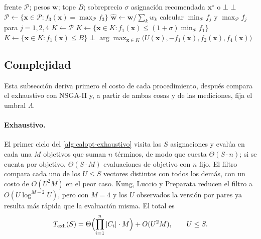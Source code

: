 \begin{algorithm}[htbp]
\caption{Selección a posteriori por utilidad aditiva (MAUT)}
\label{alg:calopt-maut}
\begin{algorithmic}[1]
\Require frente $\mathcal{P}$; pesos $\mathbf{w}$; tope $B$; sobreprecio $\sigma$
\Ensure asignación recomendada $\mathbf{x}^{\star}$ o $\bot$
   \Return $\bot$ \EndIf
  \State $\mathcal{P}\gets\{\mathbf{x}\in\mathcal{P}: f_3(\mathbf{x})=\max_{\mathcal{P}}f_3\}$ 
  \State $\hat{\mathbf{w}}\gets\mathbf{w}/\sum_k w_k$ 
  \State calcular $\min_{\mathcal{P}}f_j$ y $\max_{\mathcal{P}}f_j$ para $j=1,2,4$
  \State $K\gets\mathcal{P}$
  \If{$\sigma\neq\bot$} $K\gets\{\mathbf{x}\in K: f_1(\mathbf{x})\leq(1+\sigma)\min_{\mathcal{P}}f_1\}$ \EndIf
   $K\gets\{\mathbf{x}\in K: f_1(\mathbf{x})\leq B\}$ \EndIf
   \Return $\bot$ 
  \EndIf
  \State \Return $\arg\max_{\mathbf{x}\in K}\bigl(U(\mathbf{x}),-f_1(\mathbf{x}),f_2(\mathbf{x}),f_4(\mathbf{x})\bigr)$ 
\EndProcedure
\end{algorithmic}
\end{algorithm}

\subsection{Complejidad}
\label{sec:calopt-complejidad}

Esta subsección deriva primero el costo de cada procedimiento, después
compara el exhaustivo con NSGA-II y, a partir de ambas cosas y de las
mediciones, fija el umbral $\Lambda$.

\paragraph{Exhaustivo.} El primer ciclo del \cref{alg:calopt-exhaustivo} visita
las $S$ asignaciones y evalúa en cada una $M$ objetivos que suman $n$
términos, de modo que cuesta $\Theta(S\cdot n)$; si se cuenta por objetivo,
$\Theta(S\cdot M)$ evaluaciones de objetivo con $n$ fijo. El filtro compara
cada uno de los $U\leq S$ vectores distintos con todos los demás, con un costo
de $O(U^2M)$ en el peor caso. Kung, Luccio y Preparata
\cite{kung_finding_1975} reducen el filtro a $O(U\log^{M-2}U)$, pero con $M=4$
y los $U$ observados la versión por pares ya resulta más rápida que la
evaluación misma. El total es
\[
  T_{\mathrm{exh}}(S)=\Theta\Bigl(\prod_{i=1}^{n}|C_i|\cdot M\Bigr)+O(U^2M),
  \qquad U\leq S .
\]

